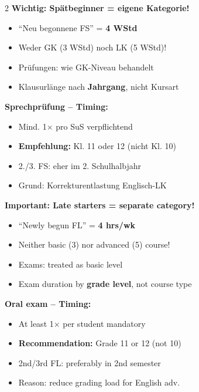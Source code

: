 \documentclass[10pt,a4paper]{article}
\begin{document}
\begin{paracol}{2}
\small
\textbf{Wichtig: Spätbeginner = eigene Kategorie!}\footnotemark[15]
\begin{itemize}[noitemsep,topsep=2pt]
\item ``Neu begonnene FS'' = \textbf{4 WStd}
\item Weder GK (3 WStd) noch LK (5 WStd)!
\item Prüfungen: wie GK-Niveau behandelt
\item Klausurlänge nach \textbf{Jahrgang}, nicht Kursart
\end{itemize}

\textbf{Sprechprüfung -- Timing:}\footnotemark[16]
\begin{itemize}[noitemsep,topsep=2pt]
\item Mind. 1$\times$ pro SuS verpflichtend
\item \textbf{Empfehlung:} Kl. 11 oder 12 (nicht Kl. 10)
\item 2./3. FS: eher im 2. Schulhalbjahr
\item Grund: Korrekturentlastung Englisch-LK
\end{itemize}

\switchcolumn

\small\color{english}
\textbf{Important: Late starters = separate category!}\footnotemark[15]
\begin{itemize}[noitemsep,topsep=2pt]
\item ``Newly begun FL'' = \textbf{4 hrs/wk}
\item Neither basic (3) nor advanced (5) course!
\item Exams: treated as basic level
\item Exam duration by \textbf{grade level}, not course type
\end{itemize}

\textbf{Oral exam -- Timing:}\footnotemark[16]
\begin{itemize}[noitemsep,topsep=2pt]
\item At least 1$\times$ per student mandatory
\item \textbf{Recommendation:} Grade 11 or 12 (not 10)
\item 2nd/3rd FL: preferably in 2nd semester
\item Reason: reduce grading load for English adv.
\end{itemize}

\end{paracol}

\end{document}
